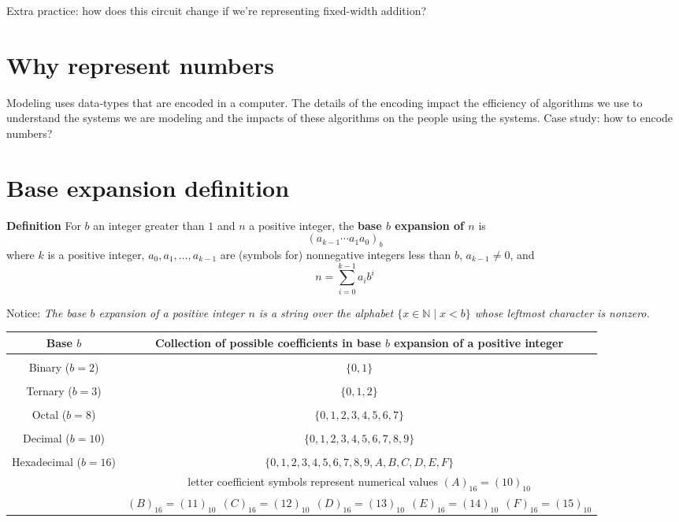 \documentclass[12pt, oneside]{article}
\newcommand{\st}{\mid}
\begin{document}
Extra practice: how does this circuit change if we're representing fixed-width addition?
 \vfill
\section*{Why represent numbers}


Modeling uses data-types that are encoded in a computer.
The details of the encoding impact the efficiency of algorithms
we use to understand the systems we are modeling and the 
impacts of these algorithms on the people using the systems.
Case study: how to encode numbers?

\vfill \vfill
\section*{Base expansion definition}


{\bf Definition} For $b$ an integer greater than $1$ and $n$ a positive integer, 
the {\bf base $b$ expansion of $n$}  is
\[
(a_{k-1} \cdots a_1 a_0)_b
\]
where $k$ is a positive integer, $a_0, a_1, \ldots, a_{k-1}$ 
are (symbols for) nonnegative integers less than $b$, $a_{k-1} \neq  0$, and
\[
n =  \sum_{i=0}^{k-1} a_{i} b^{i}
\]

Notice: {\it The base $b$ expansion of a positive integer $n$ is a string over the alphabet 
$\{x \in \mathbb{N} \st x < b\}$
whose leftmost character is nonzero.}

\begin{center}
\begin{tabular}{|c|c|}
\hline
Base $b$ & Collection of possible coefficients in base $b$ expansion of  a positive integer \\
\hline
& \\
Binary ($b=2$) & $\{0,1\}$ \\
\hline
& \\
Ternary ($b=3$) & $\{0,1, 2\}$ \\
\hline
& \\
Octal ($b=8$) & $\{0,1, 2, 3, 4, 5, 6, 7\}$\\
\hline
& \\
Decimal ($b=10$) & $\{0,1, 2, 3, 4, 5, 6, 7, 8, 9\}$\\
\hline
& \\
Hexadecimal ($b=16$) &  $\{0,1, 2, 3, 4, 5, 6, 7, 8, 9, A, B, C, D, E, F\}$\\
& letter coefficient symbols represent numerical values $(A)_{16} = (10)_{10}$\\
&$(B)_{16} = (11)_{10} ~~(C)_{16} = (12)_{10} ~~
 (D)_{16} = (13)_{10} ~~ (E)_{16} = (14)_{10} ~~ (F)_{16} = (15)_{10} $\\
\hline
\end{tabular}
\end{center}
\end{document}
